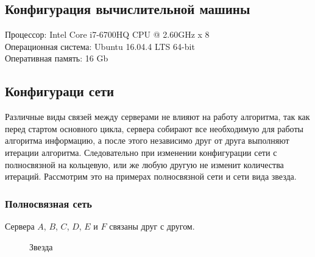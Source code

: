 		\subsection{Конфигурация вычислительной машины}
			Процессор: Intel Core i7-6700HQ CPU @ 2.60GHz x 8 \\
			Операционная система: Ubuntu 16.04.4 LTS 64-bit \\
			Оперативная память: 16 Gb


		\subsection{Конфигураци сети}	
			Различные виды связей между серверами не влияют на работу алгоритма, так как перед стартом основного цикла, сервера собирают все необходимую для работы алгоритма информацию, а после 
			этого независимо друг от друга выполняют итерации алгоритма. Следовательно при изменении конфигурации сети с полносвязной на кольцевую, или же любую другую не изменит количества 
			итераций. Рассмотрим это на примерах полносвязной сети и сети вида звезда.

			\subsubsection{Полносвязная сеть} 
				Сервера $A$, $B$, $C$, $D$, $E$ и $F$ связаны друг с другом. 
				\begin{figure}[H] 
					\centering 
					\caption{Звезда} 
				\end{figure} 

